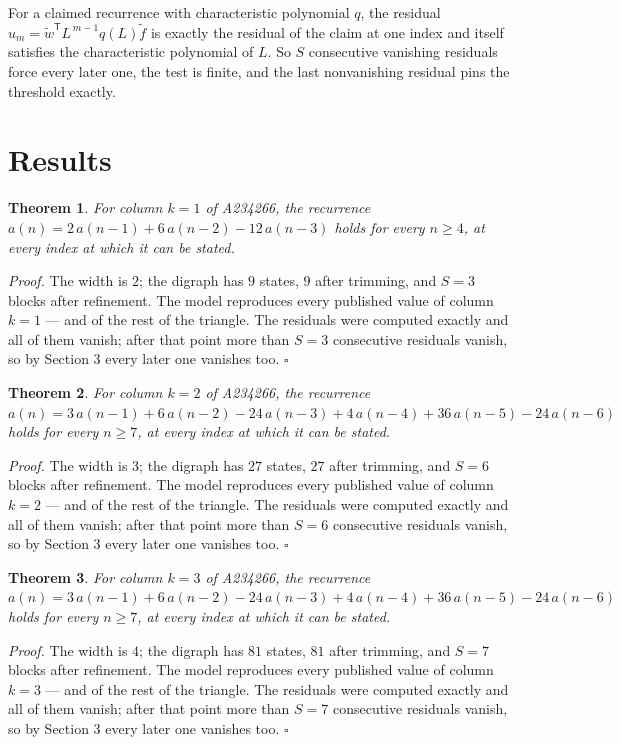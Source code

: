 \documentclass[11pt]{article}
\newtheorem{theorem}{Theorem}
\theoremstyle{definition}
\begin{document}
For a claimed recurrence with characteristic polynomial $q$, the residual $u_m = \tilde w^{\mathsf T}L^{\,m-1}q(L)\tilde f$ is exactly the residual of the claim at one index and itself satisfies the characteristic polynomial of $L$. So $S$ consecutive vanishing residuals force every later one, the test is finite, and the last nonvanishing residual pins the threshold exactly.

\section{Results}

\begin{theorem} For column $k = 1$ of A234266, the recurrence $a(n) = 2\,a(n-1) + 6\,a(n-2) - 12\,a(n-3)$ holds for every $n \ge 4$, at every index at which it can be stated.\end{theorem}

{\itshape Proof.} The width is $2$; the digraph has $9$ states, $9$ after trimming, and $S = 3$ blocks after refinement. The model reproduces every published value of column $k = 1$ --- and of the rest of the triangle. The residuals were computed exactly and all of them vanish; after that point more than $S = 3$ consecutive residuals vanish, so by Section 3 every later one vanishes too. $\square$

\begin{theorem} For column $k = 2$ of A234266, the recurrence $a(n) = 3\,a(n-1) + 6\,a(n-2) - 24\,a(n-3) + 4\,a(n-4) + 36\,a(n-5) - 24\,a(n-6)$ holds for every $n \ge 7$, at every index at which it can be stated.\end{theorem}

{\itshape Proof.} The width is $3$; the digraph has $27$ states, $27$ after trimming, and $S = 6$ blocks after refinement. The model reproduces every published value of column $k = 2$ --- and of the rest of the triangle. The residuals were computed exactly and all of them vanish; after that point more than $S = 6$ consecutive residuals vanish, so by Section 3 every later one vanishes too. $\square$

\begin{theorem} For column $k = 3$ of A234266, the recurrence $a(n) = 3\,a(n-1) + 6\,a(n-2) - 24\,a(n-3) + 4\,a(n-4) + 36\,a(n-5) - 24\,a(n-6)$ holds for every $n \ge 7$, at every index at which it can be stated.\end{theorem}

{\itshape Proof.} The width is $4$; the digraph has $81$ states, $81$ after trimming, and $S = 7$ blocks after refinement. The model reproduces every published value of column $k = 3$ --- and of the rest of the triangle. The residuals were computed exactly and all of them vanish; after that point more than $S = 7$ consecutive residuals vanish, so by Section 3 every later one vanishes too. $\square$
\end{document}
